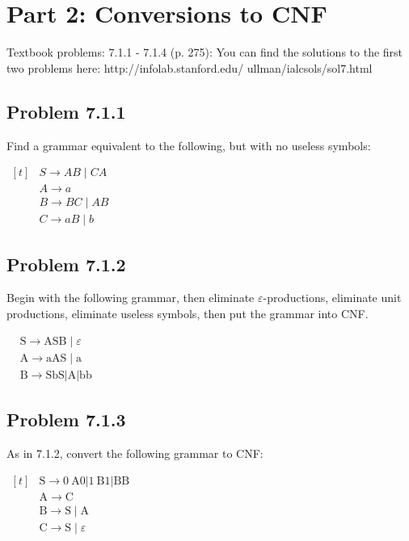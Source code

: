\documentclass[12pt]{scrbook}
\begin{document}
\newpage

\section*{Part 2: Conversions to CNF} Textbook problems: 7.1.1 - 7.1.4 (p.
275): You can find the solutions to the first two problems here:
http://infolab.stanford.edu/ ullman/ialcsols/sol7.html


\subsection*{Problem 7.1.1}Find a grammar equivalent to the following, but with
no useless symbols:

$ \begin{aligned}[t]
& S \rightarrow A B \mid C A \\
& A \rightarrow a \\
& B \rightarrow B C \mid A B \\
& C \rightarrow a B \mid b
\end{aligned} $

\newpage \subsection*{Problem 7.1.2}Begin with the following grammar, then
eliminate $\varepsilon$-productions, eliminate unit productions, eliminate
useless symbols, then put the grammar into CNF.

$ \begin{aligned}
& \mathrm{S} \rightarrow \mathrm{ASB} \mid \varepsilon \\
& \mathrm{A} \rightarrow \mathrm{aAS} \mid \mathrm{a} \\
& \mathrm{B} \rightarrow \mathrm{SbS}|\mathrm{A}| \mathrm{bb}
\end{aligned} $

\subsection*{Problem 7.1.3}As in 7.1.2, convert the following grammar to CNF:

$ \begin{aligned}[t]
& \mathrm{S} \rightarrow 0 \mathrm{~A} 0|1 \mathrm{~B} 1| \mathrm{BB} \\
& \mathrm{A} \rightarrow \mathrm{C} \\
& \mathrm{B} \rightarrow \mathrm{S} \mid \mathrm{A} \\
& \mathrm{C} \rightarrow \mathrm{S} \mid \varepsilon
\end{aligned} $
\end{document}
